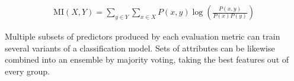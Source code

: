 \begin{itemize}
\begin{ceqn}\begin{align}
\mathrm{MI}(X, Y) = \sum_{y \in Y} \sum_{x \in X} P(x, y) \log\left(\frac{P(x, y)}{P(x)P(y)}\right)
\end{align}\end{ceqn}
\end{itemize}

Multiple subsets of predictors produced by each evaluation metric can train several variants of a classification model. Sets of attributes can be likewise combined into an ensemble by majority voting, taking the best features out of every group.